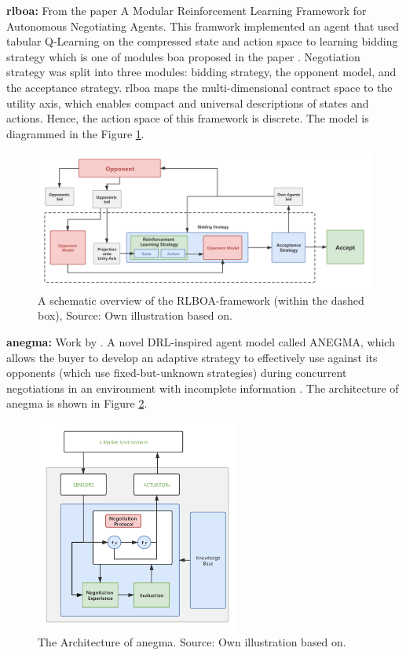 \textbf{\gls{rlboa}:} From the paper \parencite{Bakker2019RLBOAAM} A Modular Reinforcement Learning Framework for Autonomous Negotiating Agents. This framwork implemented an agent that used tabular Q-Learning on the compressed state and action space to learning bidding strategy which is one of modules \gls{boa} proposed in the paper \parencite{Baarslag2014}. Negotiation strategy was split into three modules: bidding strategy, the opponent model, and the acceptance strategy. \gls{rlboa} maps the multi-dimensional contract space to the utility axis, which enables compact and universal descriptions of states and actions. Hence, the action space of this framework is discrete. The model is diagrammed in the Figure \ref{fig:rlboa}.

\begin{figure}[htbp]
\centering
\includegraphics[width=1.0\textwidth]{./images/rlboa.png}
\caption{A schematic overview of the RLBOA-framework (within the dashed box), Source: Own illustration based
on\parencite{Bakker2019RLBOAAM}.}
\label{fig:rlboa}
\end{figure}


\textbf{\gls{anegma}:} Work by \parencite{bagga2020deep}. A novel DRL-inspired agent model called ANEGMA, which allows the buyer to develop an adaptive strategy to effectively use against its opponents (which use fixed-but-unknown strategies) during concurrent negotiations in an environment with incomplete information . The architecture of \gls{anegma} is shown in Figure \ref{fig:anegma}.
\begin{figure}[htbp]
\centering
\includegraphics[width=0.6\textwidth]{./images/anegma.png}
\caption{The Architecture of \gls{anegma}. Source: Own illustration based on\parencite{bagga2020deep}.}
\label{fig:anegma}
\end{figure}


